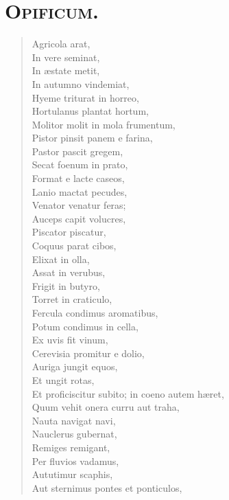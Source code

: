 \documentclass[12pt,  postvopaper]{memoir}
\begin{document}
\section*{\textsc{Opificum.}}

\begin{verse}

  Agricola arat,\\
  In vere seminat,\\
  In æstate metit,\\
  In autumno vindemiat,\\
  Hyeme triturat in horreo,\\
  Hortulanus plantat hortum,\\
  Molitor molit in mola frumentum,\\
  Pistor pinsit panem e farina,\\
  Pastor pascit gregem,\\
  Secat foenum in prato,\\
  Format e lacte caseos,\\
  Lanio mactat pecudes,\\
  Venator venatur feras;\\
  Auceps capit volucres,\\
  Piscator piscatur,\\
  Coquus parat cibos,\\
  Elixat in olla,\\
  Assat in verubus,\\
  Frigit in butyro,\\
  Torret in craticulo,\\
  Fercula condimus aromatibus,\\
  Potum condimus in cella,\\
  Ex uvis fit vinum,\\
  Cerevisia promitur e dolio,\\
  Auriga jungit equos,\\
  Et ungit rotas,\\
  Et proficiscitur subito; in coeno autem hæret,\\
  Quum vehit onera curru aut traha,\\
  Nauta navigat navi,\\
  Nauclerus gubernat,\\
  Remiges remigant,\\
  Per fluvios vadamus,\\
  Aututimur scaphis,\\
  Aut sternimus pontes et ponticulos,\\

\end{verse}
\end{document}
